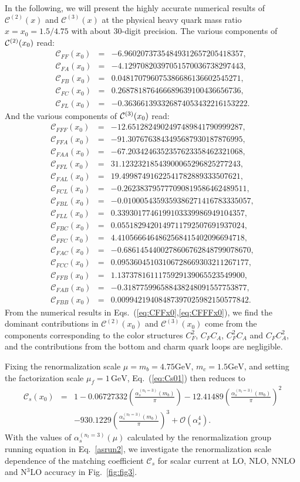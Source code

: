 \documentclass[onecolumn,preprintnumbers,aps,superscriptaddress,nofootinbib,prd,notitlepage]{revtex4-1}
\newcommand{\beq}{\begin{eqnarray}}
\newcommand{\eeq}{\end{eqnarray}}
\newcommand{\non}{\nonumber\\ }
\begin{document}
{In the following, we will present the highly accurate numerical results of $\mathcal{C}^{(2)}(x)$ and $\mathcal{C}^{(3)}(x)$ at the physical heavy quark mass ratio  $x=x_0=1.5/4.75$  with about 30-digit precision.
The various components of ${\cal C}^{(2)}(x_0)$   read:
\beq
\mathcal{C}_{FF}(x_0) &=& -6.96020737354849312657205418357, \non
\mathcal{C}_{FA}(x_0) &=& -4.12970820397051570036738297443,\non
\mathcal{C}_{FB}(x_0) &=& 0.048170796075386686136602545271, \non
\mathcal{C}_{FC}(x_0) &=& 0.268781876466689639100436656736, \non
\mathcal{C}_{FL}(x_0) &=& -0.363661393326874053432216153222.  \label{eq:CFFx0}
\eeq
And the various components of ${\cal C}^{(3)}(x_0)$ read:
\beq
  \mathcal{C}_{FFF}(x_0) &=& -12.6512824902497489841790999287, \non
  \mathcal{C}_{FFA}(x_0) &=& -91.3076763843495687930187876995, \non
  \mathcal{C}_{FAA}(x_0) &=& -67.2034246352357623358462321068,\non
  \mathcal{C}_{FFL}(x_0) &=& 31.12323218543900065296825277243, \non
  \mathcal{C}_{FAL}(x_0) &=& 19.49987491622541782889333507621, \non
  \mathcal{C}_{FCL}(x_0) &=& -0.262383795777090819586462489511, \non
  \mathcal{C}_{FBL}(x_0) &=& -0.0100054359359386271416783335057, \non
  \mathcal{C}_{FLL}(x_0) &=& 0.3393017746199103339986949104357, \non
  \mathcal{C}_{FBC}(x_0) &=& 0.0551829420149711792507691937024, \non
  \mathcal{C}_{FFC}(x_0) &=& 4.4105666464862568415402096694718, \non
  \mathcal{C}_{FAC}(x_0) &=& -0.6861454400278606762848799078670,\non
  \mathcal{C}_{FCC}(x_0) &=& 0.09536045103106728669303211267177,\non
  \mathcal{C}_{FFB}(x_0) &=& 1.1373781611175929139065523549900,\non
  \mathcal{C}_{FAB}(x_0) &=& -0.318775996588438248091557753877,\non
  \mathcal{C}_{FBB}(x_0) &=&  0.00994219408487397025982150577842. \label{eq:CFFFx0}
\eeq
From the numerical results  in Eqs.~(\ref{eq:CFFx0},\ref{eq:CFFFx0}), we find the dominant contributions in $\mathcal{C}^{(2)}(x_0)$ and $\mathcal{C}^{(3)}(x_0)$ come from the components
corresponding to the color structures $C_F^2$, $C_FC_A$, $C_F^2C_A$ and $C_FC_A^2$, and the contributions from the bottom and charm quark loops are negligible.

Fixing the renormalization scale $\mu=m_b=4.75\mathrm{GeV}$, $m_c=1.5\mathrm{GeV}$, and setting the factorization scale $\mu_f=1\,\mathrm{GeV}$, Eq.~(\ref{eq:Cs01}) then reduces to
\beq
\mathcal{C}_s(x_0) & =& 1-0.06727332\left(\frac{\alpha_s^{\left(n_l=3\right)}(m_b)}{\pi}\right)-12.41489\left(\frac{\alpha_s^{\left(n_l=3\right)}(m_b)}{\pi}\right)^2\non
&& -930.1229\left(\frac{\alpha_s^{\left(n_l=3\right)}(m_b)}{\pi}\right)^3+\mathcal{O}(\alpha_s^4). \label{Csasnum}
\eeq
With the values of $\alpha_s^{\left(n_l=3\right)}(\mu)$ calculated by the renormalization group running equation in Eq.~\eqref{asrun2},
we investigate the renormalization scale dependence of the matching coefficient $\mathcal{C}_s$ for scalar current at LO,  NLO,  NNLO and N$^3$LO accuracy in Fig.~\ref{fig:fig3}.

}
\end{document}
